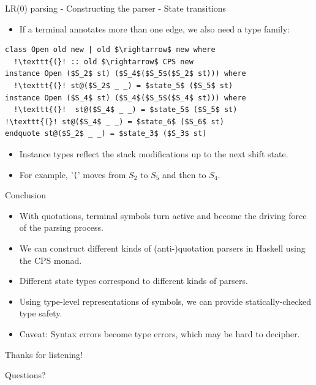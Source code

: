 \documentclass[10pt]{beamer}
\begin{document}
\begin{frame}[fragile]{LR(0) parsing - Constructing the parser - State transitions}

\begin{itemize}

\item If a terminal annotates more than one edge, we also need a type family:
\end{itemize}

\begin{lstlisting}[mathescape=true, escapechar=!]
class Open old new | old $\rightarrow$ new where
  !\texttt{(}! :: old $\rightarrow$ CPS new
instance Open ($S_2$ st) ($S_4$($S_5$($S_2$ st))) where
  !\texttt{(}! st@($S_2$ _ _) = $state_5$ ($S_5$ st)
instance Open ($S_4$ st) ($S_4$($S_5$($S_4$ st))) where
  !\texttt{(}!  st@($S_4$ _ _) = $state_5$ ($S_5$ st)
!\texttt{(}! st@($S_4$ _ _) = $state_6$ ($S_6$ st)
endquote st@($S_2$ _ _) = $state_3$ ($S_3$ st)
\end{lstlisting}

\begin{itemize}
\item Instance types reflect the stack modifications up to the next shift state.
\item For example, '\texttt{(}' moves from $S_2$ to $S_5$ and then to $S_4$.
\end{itemize}

\end{frame}

\begin{frame}[fragile]{Conclusion}

\begin{itemize}
\item With quotations, terminal symbols turn active and become the driving force of the parsing process.
\item We can construct different kinds of (anti-)quotation parsers in Haskell using the CPS monad.
\item Different state types correspond to different kinds of parsers.
\item Using type-level representations of symbols, we can provide statically-checked type safety.
\item Caveat: Syntax errors become type errors, which may be hard to decipher.
\end{itemize}

\end{frame}

\begin{frame}[fragile]{Thanks for listening!}

\begin{center}
\large Questions?
\end{center}

\end{frame}
\end{document}
